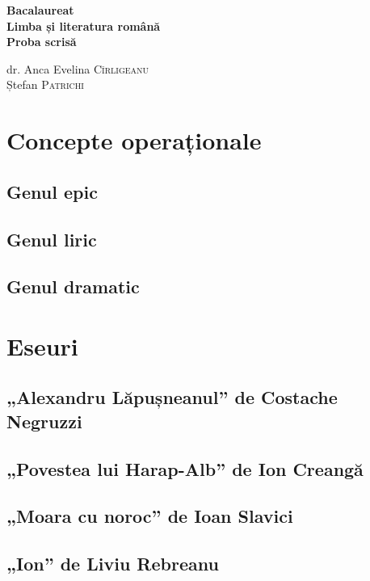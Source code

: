 \documentclass[a4paper]{book}
\begin{document}
\begin{titlepage}
\frontmatter
    \begin{center}
        \phantom{\tiny a}
   { \Huge
    \vfill
    \textbf{Bacalaureat\\Limba și literatura română\\Proba scrisă}
    \vfill
    }
    \end{center}
    
    \begin{flushright}
    \large
dr. Anca Evelina \textsc{Cîrligeanu} \\
Ștefan \textsc{Patrichi}
\end{flushright}
\end{titlepage}

\tableofcontents

\mainmatter
\chapter{Concepte operaționale}
\section{Genul epic}
\section{Genul liric}
\section{Genul dramatic}

\chapter{Eseuri}
\section{„Alexandru Lăpușneanul” de Costache Negruzzi}
\section{„Povestea lui Harap-Alb” de Ion Creangă}
\section{„Moara cu noroc” de Ioan Slavici}
\section{„Ion” de Liviu Rebreanu}
\end{document}
